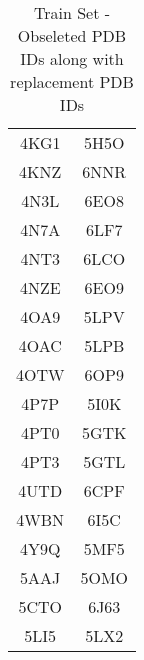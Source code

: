 \documentclass[journal=jcisd8,manuscript=article]{achemso}
\begin{document}
\begin{center}
\begin{table}[ht]
\begin{tabular}{|c|c|}
      4KG1                       & 5H5O                         \\
      4KNZ                       & 6NNR                         \\
      4N3L                       & 6EO8                         \\
      4N7A                       & 6LF7                         \\
      4NT3                       & 6LCO                         \\
      4NZE                       & 6EO9                         \\
      4OA9                       & 5LPV                         \\
      4OAC                       & 5LPB                         \\
      4OTW                       & 6OP9                         \\
      4P7P                       & 5I0K                         \\
      4PT0                       & 5GTK                         \\
      4PT3                       & 5GTL                         \\
      4UTD                       & 6CPF                         \\
      4WBN                       & 6I5C                         \\
      4Y9Q                       & 5MF5                         \\
      5AAJ                       & 5OMO                         \\
      5CTO                       & 6J63                         \\
      5LI5                       & 5LX2                         \\
      \hline
    \end{tabular}
    \caption{Train Set - Obseleted PDB IDs along with replacement PDB IDs}
    \label{table:trainobseleted}
  \end{table}
\end{center}
\clearpage
\end{document}
